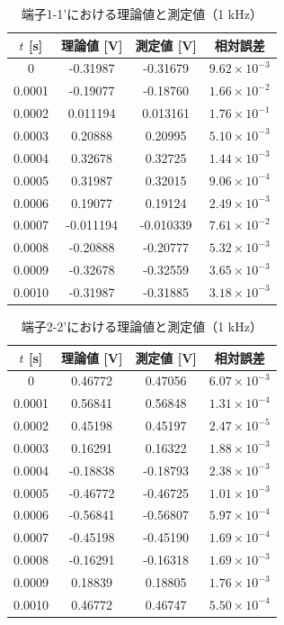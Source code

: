 \documentclass[article]{jlreq}
\begin{document}
\begin{table}[H]
\centering
\caption{端子1-1'における理論値と測定値（1 kHz）}
\begin{tabular}{cccc}
\toprule
$t$ [s] & 理論値 [V] & 測定値 [V] & 相対誤差 \\
\midrule
0      & -0.31987 & -0.31679 & $9.62\times10^{-3}$ \\
0.0001 & -0.19077 & -0.18760 & $1.66\times10^{-2}$ \\
0.0002 & 0.011194 & 0.013161 & $1.76\times10^{-1}$ \\
0.0003 & 0.20888  & 0.20995  & $5.10\times10^{-3}$ \\
0.0004 & 0.32678  & 0.32725  & $1.44\times10^{-3}$ \\
0.0005 & 0.31987  & 0.32015  & $9.06\times10^{-4}$ \\
0.0006 & 0.19077  & 0.19124  & $2.49\times10^{-3}$ \\
0.0007 & -0.011194 & -0.010339 & $7.61\times10^{-2}$ \\
0.0008 & -0.20888 & -0.20777 & $5.32\times10^{-3}$ \\
0.0009 & -0.32678 & -0.32559 & $3.65\times10^{-3}$ \\
0.0010 & -0.31987 & -0.31885 & $3.18\times10^{-3}$ \\
\bottomrule
\end{tabular}
\end{table}

\begin{table}[H]
\centering
\caption{端子2-2'における理論値と測定値（1 kHz）}
\begin{tabular}{cccc}
\toprule
$t$ [s] & 理論値 [V] & 測定値 [V] & 相対誤差 \\
\midrule
0      & 0.46772  & 0.47056  & $6.07\times10^{-3}$ \\
0.0001 & 0.56841  & 0.56848  & $1.31\times10^{-4}$ \\
0.0002 & 0.45198  & 0.45197  & $2.47\times10^{-5}$ \\
0.0003 & 0.16291  & 0.16322  & $1.88\times10^{-3}$ \\
0.0004 & -0.18838 & -0.18793 & $2.38\times10^{-3}$ \\
0.0005 & -0.46772 & -0.46725 & $1.01\times10^{-3}$ \\
0.0006 & -0.56841 & -0.56807 & $5.97\times10^{-4}$ \\
0.0007 & -0.45198 & -0.45190 & $1.69\times10^{-4}$ \\
0.0008 & -0.16291 & -0.16318 & $1.69\times10^{-3}$ \\
0.0009 & 0.18839  & 0.18805  & $1.76\times10^{-3}$ \\
0.0010 & 0.46772  & 0.46747  & $5.50\times10^{-4}$ \\
\bottomrule
\end{tabular}
\end{table}
\end{document}
